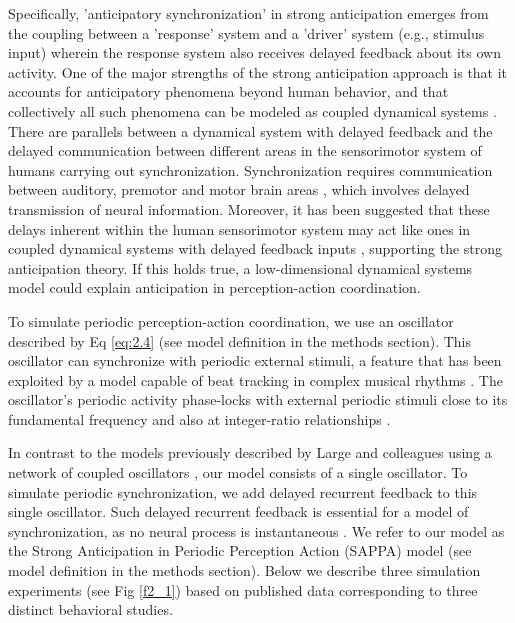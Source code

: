 \documentclass{report}
\begin{document}
Specifically, 'anticipatory synchronization' in strong anticipation emerges from the coupling between a 'response' system and a 'driver' system (e.g., stimulus input) wherein the response system also receives delayed feedback about its own activity. One of the major strengths of the strong anticipation approach is that it accounts for anticipatory phenomena beyond human behavior, and that collectively all such phenomena can be modeled as coupled dynamical systems \cite{stepp2010strong, washburn2015harmony, kelso1995dynamic}. There are parallels between a dynamical system with delayed feedback and the delayed communication between different areas in the sensorimotor system of humans carrying out synchronization. Synchronization requires communication between auditory, premotor and motor brain areas \cite{merchant2015finding, banerjee2007neural, slowinski2016effects}, which involves delayed transmission of neural information. Moreover, it has been suggested that these delays inherent within the human sensorimotor system may act like ones in coupled dynamical systems with delayed feedback inputs \cite{washburn2015harmony, banerjee2007neural, slowinski2016effects}, supporting the strong anticipation theory. If this holds true, a low-dimensional dynamical systems model could explain anticipation in perception-action coordination.

To simulate periodic perception-action coordination, we use an oscillator described by Eq \eqref{eq:2.4} (see model definition in the methods section). This oscillator can synchronize with periodic external stimuli, a feature that has been exploited by a model capable of beat tracking in complex musical rhythms \cite{large2015neural, velasco2011pulse}. The oscillator’s periodic activity phase-locks with external periodic stimuli close to its fundamental frequency and also at integer-ratio relationships \cite{large2010canonical}.

In contrast to the models previously described by Large and colleagues using a network of coupled oscillators \cite{large2015neural, velasco2011pulse, large2010canonical}, our model consists of a single oscillator. To simulate periodic synchronization, we add delayed recurrent feedback to this single oscillator. Such delayed recurrent feedback is essential for a model of synchronization, as no neural process is instantaneous \cite{banerjee2007neural}. We refer to our model as the Strong Anticipation in Periodic Perception Action (SAPPA) model (see model definition in the methods section). Below we describe three simulation experiments (see Fig \ref{f2_1}) based on published data corresponding to three distinct behavioral studies.
\end{document}

